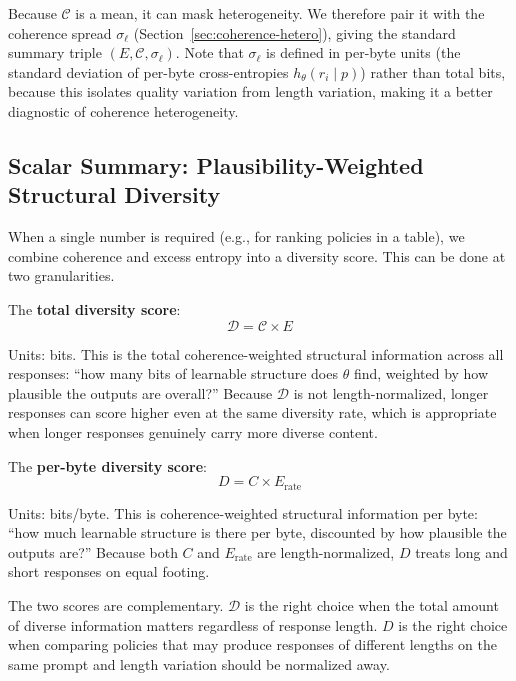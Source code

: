 \documentclass[11pt]{article}
\begin{document}
Because $\mathcal{C}$ is a mean, it can mask heterogeneity. We therefore pair it with the coherence spread $\sigma_\ell$ (Section~\ref{sec:coherence-hetero}), giving the standard summary triple $(E, \mathcal{C}, \sigma_\ell)$. Note that $\sigma_\ell$ is defined in per-byte units (the standard deviation of per-byte cross-entropies $h_\theta(r_i \mid p)$) rather than total bits, because this isolates quality variation from length variation, making it a better diagnostic of coherence heterogeneity.

\subsection{Scalar Summary: Plausibility-Weighted Structural Diversity}\label{sec:scalar}

When a single number is required (e.g., for ranking policies in a table), we combine coherence and excess entropy into a diversity score. This can be done at two granularities.

The \textbf{total diversity score}:
\begin{equation}\label{eq:D-total}
    \mathcal{D} = \mathcal{C} \times E
\end{equation}

Units: bits. This is the total coherence-weighted structural information across all responses: ``how many bits of learnable structure does $\theta$ find, weighted by how plausible the outputs are overall?'' Because $\mathcal{D}$ is not length-normalized, longer responses can score higher even at the same diversity rate, which is appropriate when longer responses genuinely carry more diverse content.

The \textbf{per-byte diversity score}:
\begin{equation}\label{eq:D}
    D = C \times E_{\mathrm{rate}}
\end{equation}

Units: bits/byte. This is coherence-weighted structural information per byte: ``how much learnable structure is there per byte, discounted by how plausible the outputs are?'' Because both $C$ and $E_{\mathrm{rate}}$ are length-normalized, $D$ treats long and short responses on equal footing.

The two scores are complementary. $\mathcal{D}$ is the right choice when the total amount of diverse information matters regardless of response length. $D$ is the right choice when comparing policies that may produce responses of different lengths on the same prompt and length variation should be normalized away.
\end{document}
